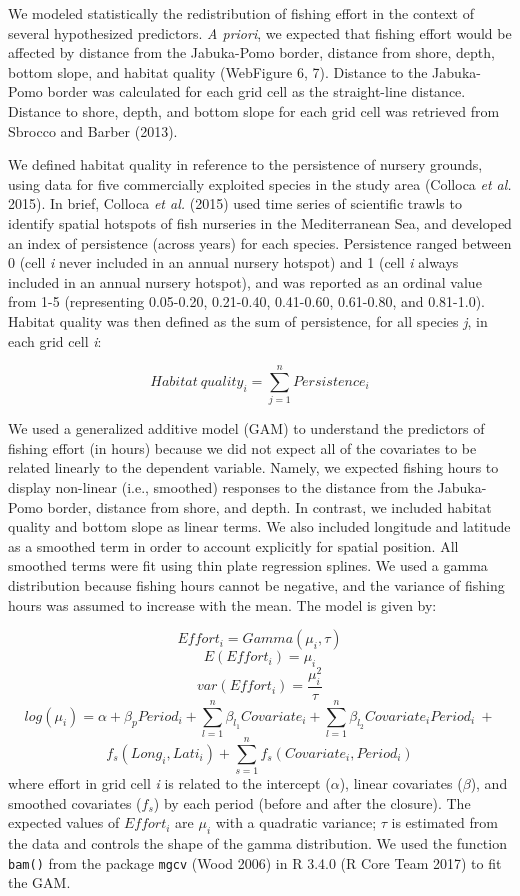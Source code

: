 \documentclass[11pt,]{article}
\begin{document}
We modeled statistically the redistribution of fishing effort in the
context of several hypothesized predictors. \emph{A priori}, we expected
that fishing effort would be affected by distance from the Jabuka-Pomo
border, distance from shore, depth, bottom slope, and habitat quality
(WebFigure 6, 7). Distance to the Jabuka-Pomo border was calculated for
each grid cell as the straight-line distance. Distance to shore, depth,
and bottom slope for each grid cell was retrieved from Sbrocco and
Barber (2013).

We defined habitat quality in reference to the persistence of nursery
grounds, using data for five commercially exploited species in the study
area (Colloca \emph{et al.} 2015). In brief, Colloca \emph{et al.}
(2015) used time series of scientific trawls to identify spatial
hotspots of fish nurseries in the Mediterranean Sea, and developed an
index of persistence (across years) for each species. Persistence ranged
between 0 (cell \emph{i} never included in an annual nursery hotspot)
and 1 (cell \emph{i} always included in an annual nursery hotspot), and
was reported as an ordinal value from 1-5 (representing 0.05-0.20,
0.21-0.40, 0.41-0.60, 0.61-0.80, and 0.81-1.0). Habitat quality was then
defined as the sum of persistence, for all species \emph{j}, in each
grid cell \emph{i}:

\[Habitat\ quality_{i} = \sum_{j=1}^{n}Persistence_{i}\]

We used a generalized additive model (GAM) to understand the predictors
of fishing effort (in hours) because we did not expect all of the
covariates to be related linearly to the dependent variable. Namely, we
expected fishing hours to display non-linear (i.e., smoothed) responses
to the distance from the Jabuka-Pomo border, distance from shore, and
depth. In contrast, we included habitat quality and bottom slope as
linear terms. We also included longitude and latitude as a smoothed term
in order to account explicitly for spatial position. All smoothed terms
were fit using thin plate regression splines. We used a gamma
distribution because fishing hours cannot be negative, and the variance
of fishing hours was assumed to increase with the mean. The model is
given by:

\[Effort_{i} = Gamma(\mu_{i}, \tau)\] \[E(Effort_{i}) = \mu_{i}\]
\[var(Effort_{i}) = \frac{\mu^{2}_{i}}{\tau}\]
\[log(\mu_{i}) = \alpha + \beta_{p}Period_{i} + \sum_{l=1}^{n}\beta_{l_{1}}Covariate_{i} + \sum_{l=1}^{n}\beta_{l_{2}}Covariate_{i}Period_{i} ~+\]
\[f_{s}(Long_{i}, Lati_{i}) + \sum_{s=1}^{n}f_{s}(Covariate_{i},Period_{i})\]
where effort in grid cell \emph{i} is related to the intercept
(\(\alpha\)), linear covariates (\(\beta\)), and smoothed covariates
(\(f_{s}\)) by each period (before and after the closure). The expected
values of \(Effort_{i}\) are \(\mu_{i}\) with a quadratic variance;
\(\tau\) is estimated from the data and controls the shape of the gamma
distribution. We used the function \texttt{bam()} from the package
\texttt{mgcv} (Wood 2006) in R 3.4.0 (R Core Team 2017) to fit the GAM.
\end{document}
